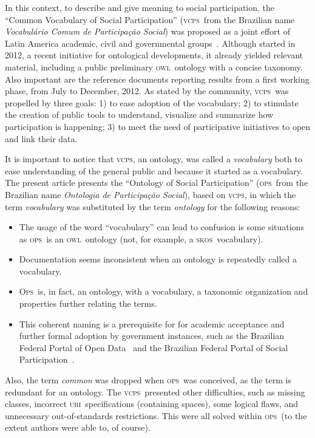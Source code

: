 \documentclass[10pt,letterpaper]{article}
\newcommand{\ops}{\textsc{ops}}
\newcommand{\opsi}{O\textsc{ps}}
\newcommand{\vcps}{\textsc{vcps}}
\newcommand{\owl}{\textsc{owl}}
\newcommand{\skos}{\textsc{skos}}
\newcommand{\uri}{\textsc{uri}}
\begin{document}
In this context, to describe and give meaning to social participation, the ``Common Vocabulary of Social Participation'' (\vcps\ from the Brazilian name \emph{Vocabul\'ario Comum de Participa\c{c}\~ao Social}) was proposed as a joint effort of Latin America academic, civil and governmental groups~\cite{corais}. Although started in 2012, a recent initiative for ontological developments, it already yielded relevant material, including a public preliminary \owl\ ontology with a concise taxonomy. Also important are the reference documents reporting results from a first working phase, from July to December, 2012. 
As stated by the community, \vcps\ was propelled by three goals: 1) to ease adoption of the vocabulary; 2) to stimulate the creation of public tools to understand, visualize and summarize how participation is happening; 3) to meet the need of participative initiatives to open and link their data. 

It is important to notice that \vcps, an ontology, was called a \emph{vocabulary} both to ease understanding of the general public and because it started as a vocabulary. The present article presents the ``Ontology of Social Participation'' (\ops\ from the Brazilian name \emph{Ontologia de Participa\c{c}\~ao Social}), based on \vcps, in which the term \emph{vocabulary} was substituted by the term \emph{ontology} for the following reasons:

\begin{itemize}
    \item The usage of the word ``vocabulary'' can lead to confusion is some situations as \ops\ is an \owl\ ontology (not, for example, a \skos\ vocabulary).
    \item Documentation seems inconsistent when an ontology is repeatedly called a vocabulary.
    \item \opsi\ is, in fact, an ontology, with a vocabulary, a taxonomic organization and properties further relating the terms.
    \item This coherent naming is a prerequisite for for academic acceptance and further formal adoption by government instances, such as the Brazilian Federal Portal of Open Data~\cite{dadosGov} and the Brazilian Federal Portal of Social Participation~\cite{participa}.
\end{itemize}

Also, the term \emph{common} was dropped when \ops\ was conceived, as the term is redundant for an ontology. The \vcps\ presented other difficulties, such as missing classes, incorrect \uri\ specifications (containing spaces), some logical flaws, and unnecessary out-of-standards restrictions. This were all solved within \ops\ (to the extent authors were able to, of course).
\end{document}
